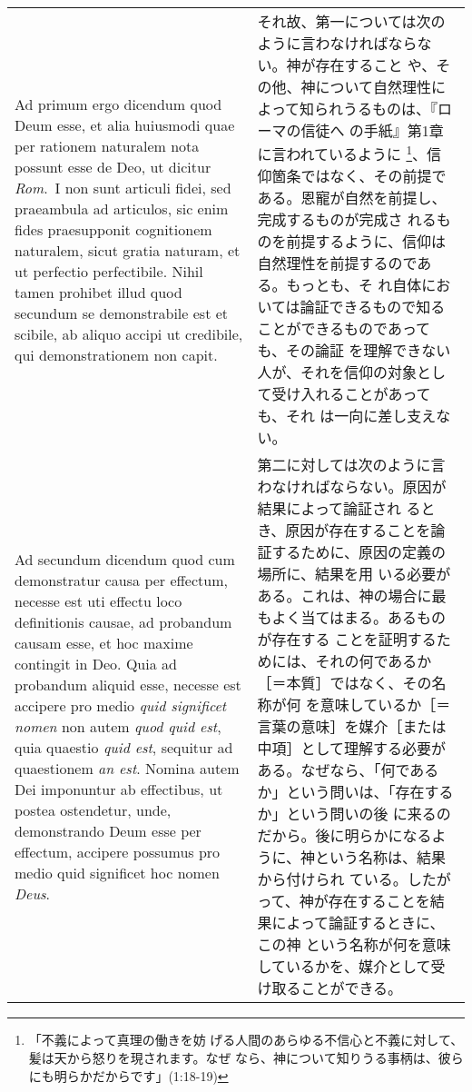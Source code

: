 \documentclass[10pt]{jsarticle} %
\begin{document}
\begin{longtable}{p{21em}p{21em}}
\\



{\sc Ad primum ergo dicendum} quod Deum esse, et
 alia huiusmodi quae per rationem naturalem nota possunt esse de Deo, ut
 dicitur {\it Rom}.~I non sunt articuli fidei, sed praeambula ad articulos,
 sic enim fides praesupponit cognitionem naturalem, sicut gratia
 naturam, et ut perfectio perfectibile. Nihil tamen prohibet illud quod
 secundum se demonstrabile est et scibile, ab aliquo accipi ut
 credibile, qui demonstrationem non capit.

& それ故、第一については次のように言わなければならない。神が存在すること
や、その他、神について自然理性によって知られうるものは、『ローマの信徒へ
の手紙』第1章に言われているように \footnote{「不義によって真理の働きを妨
げる人間のあらゆる不信心と不義に対して、髪は天から怒りを現されます。なぜ
なら、神について知りうる事柄は、彼らにも明らかだからです」(1:18-19)}、信
仰箇条ではなく、その前提である。恩寵が自然を前提し、完成するものが完成さ
れるものを前提するように、信仰は自然理性を前提するのである。もっとも、そ
れ自体においては論証できるもので知ることができるものであっても、その論証
を理解できない人が、それを信仰の対象として受け入れることがあっても、それ
は一向に差し支えない。

\\



{\sc Ad secundum dicendum} quod cum demonstratur
 causa per effectum, necesse est uti effectu loco definitionis causae,
 ad probandum causam esse, et hoc maxime contingit in Deo. Quia ad
 probandum aliquid esse, necesse est accipere pro medio {\it quid significet
 nomen} non autem {\it quod quid est}, quia quaestio {\it quid est}, sequitur ad
 quaestionem {\it an est}. Nomina autem Dei imponuntur ab effectibus, ut
 postea ostendetur, unde, demonstrando Deum esse per effectum, accipere
 possumus pro medio quid significet hoc nomen {\it Deus}.

&

第二に対しては次のように言わなければならない。原因が結果によって論証され
 るとき、原因が存在することを論証するために、原因の定義の場所に、結果を用
 いる必要がある。これは、神の場合に最もよく当てはまる。あるものが存在する
 ことを証明するためには、それの何であるか［＝本質］ではなく、その名称が何
 を意味しているか［＝言葉の意味］を媒介［または中項］として理解する必要が
 ある。なぜなら、「何であるか」という問いは、「存在するか」という問いの後
 に来るのだから。後に明らかになるように、神という名称は、結果から付けられ
 ている。したがって、神が存在することを結果によって論証するときに、この神
 という名称が何を意味しているかを、媒介として受け取ることができる。


\end{longtable}
\end{document}
